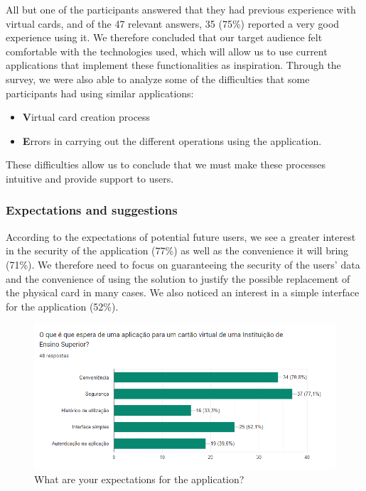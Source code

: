 \documentclass[10pt]{article}
\begin{document}
All but one of the participants answered that they had previous experience with virtual cards, and of the 47 relevant answers, 35 (75\%) reported a very good experience using it. We therefore concluded that our target audience felt comfortable with the technologies used, which will allow us to use current applications that implement these functionalities as inspiration.
Through the survey, we were also able to analyze some of the difficulties that some participants had using similar applications:
\begin{itemize}
    \item \textbf Virtual card creation process
    \item \textbf Errors in carrying out the different operations using the application.
\end{itemize}


These difficulties allow us to conclude that we must make these processes intuitive and provide support to users.



\subsubsection{Expectations and suggestions}

According to the expectations of potential future users, we see a greater interest in the security of the application (77\%) as well as the convenience it will bring (71\%). We therefore need to focus on guaranteeing the security of the users' data and the convenience of using the solution to justify the possible replacement of the physical card in many cases.
We also noticed an interest in a simple interface for the application (52\%).

\begin{figure}[h]
    \centering
    \includegraphics[width=1\textwidth]{report-images/questionaire4.png}
    \caption{What are your expectations for the application?}
    \label{fig:fig-6}
\end{figure}
\end{document}
